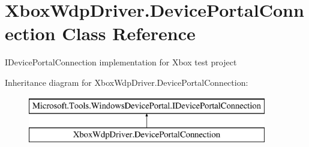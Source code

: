 \hypertarget{class_xbox_wdp_driver_1_1_device_portal_connection}{}\section{Xbox\+Wdp\+Driver.\+Device\+Portal\+Connection Class Reference}
\label{class_xbox_wdp_driver_1_1_device_portal_connection}


I\+Device\+Portal\+Connection implementation for Xbox test project  


Inheritance diagram for Xbox\+Wdp\+Driver.\+Device\+Portal\+Connection\+:\begin{figure}[H]
\begin{center}
\leavevmode
\includegraphics[height=2.000000cm]{class_xbox_wdp_driver_1_1_device_portal_connection}
\end{center}
\end{figure}
